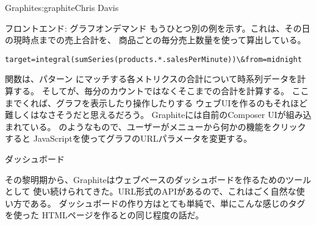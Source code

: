 \begin{aosachapter}{Graphite}{s:graphite}{Chris Davis}
\begin{aosasect1}{フロントエンド: グラフオンデマンド}
もうひとつ別の例を示す。これは、その日の現時点までの売上合計を、
商品ごとの毎分売上数量を使って算出している。

\begin{verbatim}
target=integral(sumSeries(products.*.salesPerMinute))\&from=midnight
\end{verbatim}

\noindent
{}関数は、パターン
にマッチする各メトリクスの合計について時系列データを計算する。
そしてが、毎分のカウントではなくそこまでの合計を計算する。
ここまでくれば、グラフを表示したり操作したりする
ウェブUIを作るのもそれほど難しくはなさそうだと思えるだろう。
Graphiteには自前のComposer UIが組み込まれている。
のようなもので、ユーザーがメニューから何かの機能をクリックすると
JavaScriptを使ってグラフのURLパラメータを変更する。


\end{aosasect1}

\begin{aosasect1}{ダッシュボード}

その黎明期から、Graphiteはウェブベースのダッシュボードを作るためのツールとして
使い続けられてきた。URL形式のAPIがあるので、これはごく自然な使い方である。
ダッシュボードの作り方はとても単純で、単にこんな感じのタグを使った
HTMLページを作るとの同じ程度の話だ。


\end{aosasect1}
\end{aosachapter}
